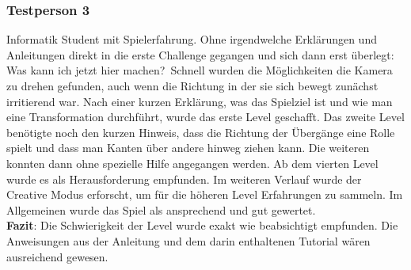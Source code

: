 \subsubsection*{Testperson 3}

Informatik Student mit Spielerfahrung. Ohne irgendwelche Erklärungen und Anleitungen direkt in die erste Challenge gegangen und sich dann erst überlegt: \glqq Was kann ich jetzt hier machen?\grqq~Schnell wurden die Möglichkeiten die Kamera zu drehen gefunden, auch wenn die Richtung in der sie sich bewegt zunächst irritierend war. Nach einer kurzen Erklärung, was das Spielziel ist und wie man eine Transformation durchführt, wurde das erste Level geschafft. Das zweite Level benötigte noch den kurzen Hinweis, dass die Richtung der Übergänge eine Rolle spielt und dass man Kanten über andere hinweg ziehen kann. Die weiteren konnten dann ohne spezielle Hilfe angegangen werden. Ab dem vierten Level wurde es als Herausforderung empfunden. Im weiteren Verlauf wurde der Creative Modus erforscht, um für die höheren Level Erfahrungen zu sammeln. Im Allgemeinen wurde das Spiel als ansprechend und gut gewertet.\\

{\bf Fazit}: Die Schwierigkeit der Level wurde exakt wie beabsichtigt empfunden. Die Anweisungen aus der Anleitung und dem darin enthaltenen Tutorial wären ausreichend gewesen.





